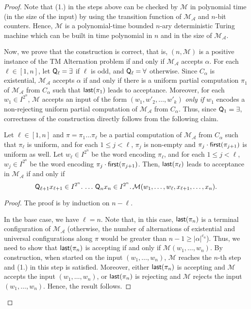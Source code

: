 \begin{proof}
Note that (1.) in the steps above can be checked by $\mathcal{M}$ in polynomial time (in the size of the input) by using the transition function of $\mathcal{M}_{\mathcal{A}}$ and $n$-bit counters. Hence, $\mathcal{M}$ is a polynomial-time bounded $n$-ary deterministic Turing machine which can be built in time polynomial in $n$ and in the size of $\mathcal{M}_{\mathcal{A}}$. 

Now, we prove that the construction is correct, that is, $(n,\mathcal{M})$ is a positive instance of the TM Alternation problem if and only if $\mathcal{M}_{\mathcal{A}}$ accepts $\alpha$. For each $\ell\in [1,n]$, let $\text{{\sffamily Q}}_\ell=\exists$ if $\ell$ is odd, and $\text{{\sffamily Q}}_\ell=\forall$ otherwise.
Since $C_\alpha$ is existential, $\mathcal{M}_{\mathcal{A}}$ accepts $\alpha$ if and only if there is a  uniform partial  computation $\pi_1$ of  $\mathcal{M}_{\mathcal{A}}$ from $C_\alpha$ such that $\text{{\sffamily last}}(\pi_1)$ leads to acceptance. Moreover, for each $w_{1}\in I^{2^{n}}$, $\mathcal{M}$  accepts an input of the form $(w_1,w'_2,\ldots,w'_k)$ \emph{only if} $w_1$ encodes a non-rejecting uniform partial computation of $\mathcal{M}_{\mathcal{A}}$ from $C_\alpha$. Thus, since $\text{{\sffamily Q}}_1=\exists$, correctness of the construction directly follows from the following claim.


\begin{claim}
Let $\ell\in [1,n]$ and $\pi=\pi_1\ldots\pi_\ell$ be a partial computation of $\mathcal{M}_{\mathcal{A}}$ from $C_\alpha$ such that $\pi_\ell$ is uniform, and for each $1\leq j<\ell$, $\pi_j$ is non-empty and $\pi_j\cdot \text{{\sffamily first}}(\pi_{j+1})$ is uniform as well. Let $w_\ell\in I^{2^{n}}$ be the word encoding $\pi_\ell$, and for each $1\leq j<\ell$, $w_j\in I^{2^{n}}$ be the word encoding $\pi_j\cdot \text{{\sffamily first}}(\pi_{j+1})$. Then, $\text{{\sffamily last}}(\pi_\ell)$ leads to acceptance in $\mathcal{M}_{\mathcal{A}}$  if and only if
%
\begin{equation}\label{eq:Alternation}
\text{{\sffamily Q}}_{\ell+1} x_{\ell+1}\in I^{2^{n}}.\, \ldots \,\text{{\sffamily Q}}_n x_n\in I^{2^{n}}.\, \mathcal{M}(w_1,\ldots,w_\ell,x_{\ell+1},\ldots,x_n).
\end{equation}
\end{claim}
\begin{proof} The proof is by induction on $n-\ell$.

 In the base case, we have $\ell=n$. Note that, in this case, $\text{{\sffamily last}}(\pi_n)$ is a terminal configuration of $\mathcal{M}_{\mathcal{A}}$  (otherwise, the  number of alternations of existential and universal configurations along $\pi$ would be greater than $n-1\geq |\alpha|^{c_a}$). Thus, we need to show that $\text{{\sffamily last}}(\pi_n)$ is accepting if and only if $\mathcal{M}(w_1,\ldots,w_n)$. By construction, when started on the input $(w_1,\ldots,w_n)$, $\mathcal{M}$ reaches the $n$-th step and (1.) in this step is satisfied. Moreover, either $\text{{\sffamily last}}(\pi_n)$ is accepting and $\mathcal{M}$ accepts the input  $(w_1,\ldots,w_n)$, or
$\text{{\sffamily last}}(\pi_n)$ is rejecting and $\mathcal{M}$ rejects the input  $(w_1,\ldots,w_n)$. Hence, the result follows.



\end{proof}
\end{proof}
